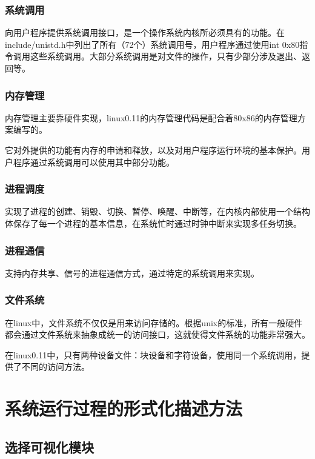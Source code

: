 \documentclass[]{report}
\begin{document}
\subsection{系统调用}

向用户程序提供系统调用接口，是一个操作系统内核所必须具有的功能。在include/unistd.h中列出了所有（72个）系统调用号，用户程序通过使用int 0x80指令调用这些系统调用。大部分系统调用是对文件的操作，只有少部分涉及退出、返回等。

\subsection{内存管理}

内存管理主要靠硬件实现，linux0.11的内存管理代码是配合着80x86的内存管理方案编写的。

它对外提供的功能有内存的申请和释放，以及对用户程序运行环境的基本保护。用户程序通过系统调用可以使用其中部分功能。

\subsection{进程调度}

实现了进程的创建、销毁、切换、暂停、唤醒、中断等，在内核内部使用一个结构体保存了每一个进程的基本信息，在系统忙时通过时钟中断来实现多任务切换。

\subsection{进程通信}

支持内存共享、信号的进程通信方式，通过特定的系统调用来实现。

\subsection{文件系统}

在linux中，文件系统不仅仅是用来访问存储的。根据unix的标准，所有一般硬件都会通过文件系统来抽象成统一的访问接口，这就使得文件系统的功能非常强大。

在linux0.11中，只有两种设备文件：块设备和字符设备，使用同一个系统调用，提供了不同的访问方法。

\chapter{系统运行过程的形式化描述方法}

\section{选择可视化模块}
\end{document}
